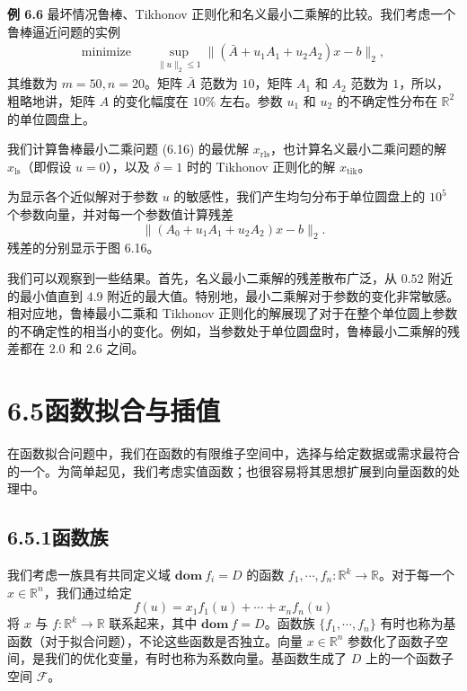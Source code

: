 \documentclass[UTF8,12pt,a4paper,fontset=fandol]{ctexart}
\begin{document}
\noindent\textbf{例 6.6}\quad
最坏情况鲁棒、Tikhonov 正则化和名义最小二乘解的比较。我们考虑一个鲁棒逼近问题的实例
\begin{equation}
\begin{aligned}
\text{minimize}\quad & \sup_{\|u\|_2\leq 1}\|(\bar{A}+u_1A_1+u_2A_2)x-b\|_2,
\end{aligned}
\tag{6.16}
\end{equation}
其维数为 $m=50,n=20$。矩阵 $\bar{A}$ 范数为 $10$，矩阵 $A_1$ 和 $A_2$ 范数为 $1$，所以，粗略地讲，矩阵 $A$ 的变化幅度在 $10\%$ 左右。参数 $u_1$ 和 $u_2$ 的不确定性分布在 $\mathbb{R}^2$ 的单位圆盘上。

我们计算鲁棒最小二乘问题 (6.16) 的最优解 $x_{\mathrm{rls}}$，也计算名义最小二乘问题的解 $x_{\mathrm{ls}}$（即假设 $u=0$），以及 $\delta=1$ 时的 Tikhonov 正则化的解 $x_{\mathrm{tik}}$。

为显示各个近似解对于参数 $u$ 的敏感性，我们产生均匀分布于单位圆盘上的 $10^5$ 个参数向量，并对每一个参数值计算残差
\[
\|(A_0+u_1A_1+u_2A_2)x-b\|_2.
\]
残差的分别显示于图 6.16。

我们可以观察到一些结果。首先，名义最小二乘解的残差散布广泛，从 $0.52$ 附近的最小值直到 $4.9$ 附近的最大值。特别地，最小二乘解对于参数的变化非常敏感。相对应地，鲁棒最小二乘和 Tikhonov 正则化的解展现了对于在整个单位圆上参数的不确定性的相当小的变化。例如，当参数处于单位圆盘时，鲁棒最小二乘解的残差都在 $2.0$ 和 $2.6$ 之间。

\section*{6.5\quad 函数拟合与插值}

在函数拟合问题中，我们在函数的有限维子空间中，选择与给定数据或需求最符合的一个。为简单起见，我们考虑实值函数；也很容易将其思想扩展到向量函数的处理中。

\subsection*{6.5.1\quad 函数族}

我们考虑一族具有共同定义域 $\mathbf{dom}\ f_i=D$ 的函数 $f_1,\cdots,f_n:\mathbb{R}^k\to\mathbb{R}$。对于每一个 $x\in\mathbb{R}^n$，我们通过给定
\begin{equation}
f(u)=x_1f_1(u)+\cdots+x_nf_n(u)
\tag{6.17}
\end{equation}
将 $x$ 与 $f:\mathbb{R}^k\to\mathbb{R}$ 联系起来，其中 $\mathbf{dom}\ f=D$。函数族 $\{f_1,\cdots,f_n\}$ 有时也称为基函数（对于拟合问题），不论这些函数是否独立。向量 $x\in\mathbb{R}^n$ 参数化了函数子空间，是我们的优化变量，有时也称为系数向量。基函数生成了 $D$ 上的一个函数子空间 $\mathcal{F}$。
\end{document}
